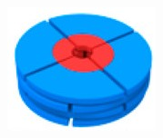 \documentclass{article}
\begin{document}
  \begin{figure}
  \centering
	\begin{subfigure}{0.45\linewidth}
		\centering
		\includegraphics[width=\textwidth]{nanopore_undetailed.jpg}
		\caption{}~\label{fig:undetailed_pore}
	\end{subfigure}
	\begin{subfigure}{0.45\linewidth}
		\centering

\end{subfigure}
\end{figure}
\end{document}
